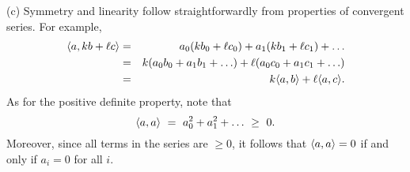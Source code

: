 \begin{ex}
\begin{sol}
    (c) Symmetry and linearity follow straightforwardly from
    properties of convergent series. For example,
    \begin{eqnarray*}
      \langle a,kb+\ell c\rangle
      &=& a_0(kb_0+\ell c_0) + a_1(kb_1+\ell c_1) + \ldots \\
      &=& k(a_0b_0 + a_1b_1 + \ldots) + \ell(a_0c_0 + a_1c_1 + \ldots) \\
      &=& k\langle a,b\rangle + \ell\langle a,c\rangle.
    \end{eqnarray*}
    As for the positive definite property, note that
    \begin{equation*}
      \langle a,a\rangle
      ~=~ a_0^2 + a_1^2 + \ldots
      ~\geq~ 0.
    \end{equation*}
    Moreover, since all terms in the series are $\geq 0$, it follows
    that $\langle a,a\rangle=0$ if and only if $a_i=0$ for all $i$.
  \end{sol}
\end{ex}
